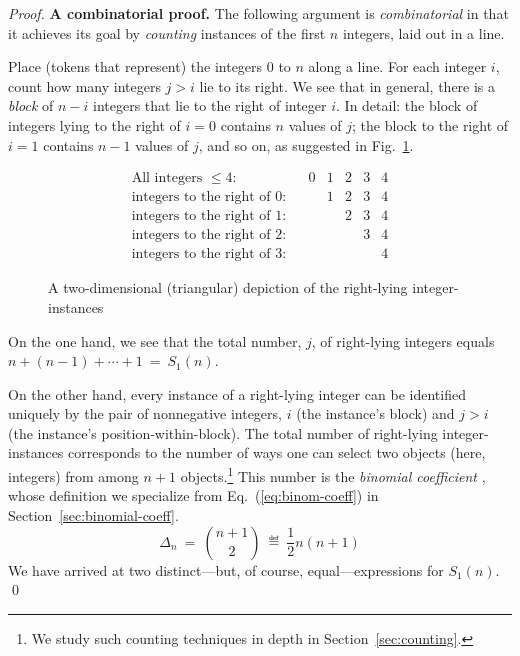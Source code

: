 \begin{proof}
{\bf A combinatorial proof.}
The following argument is {\it combinatorial} in that it achieves its goal by {\em counting} instances of the first $n$ integers, laid out in a line.

\smallskip

Place (tokens that represent) the integers $0$ to $n$ along a line.  For each integer $i$, count how many integers $j > i$ lie to its right.  We see that in general, there is a {\it block} of $n-i$ integers that lie to the right of integer $i$.  In detail: the block of integers lying to the right of $i=0$ contains $n$ values of $j$; the block to the right of $i=1$ contains $n-1$ values of $j$, and so on, as suggested in Fig.~\ref{fig:rightward-instances}.
\begin{figure}[htb]
\[
\begin{array}{lcccccc}
\mbox{All integers $\leq 4$:} &
 & 0 & 1 & 2 & 3 & 4 \\
\mbox{integers to the right of $0$:} &
 &   & 1 & 2 & 3 & 4 \\
\mbox{integers to the right of $1$:} &
 &   &   & 2 & 3 & 4 \\
\mbox{integers to the right of $2$:} &
 &   &   &   & 3 & 4 \\
\mbox{integers to the right of $3$:} &
 &   &   &   &   & 4
\end{array}
\]
\caption{A two-dimensional (triangular) depiction of the right-lying integer-instances}
\label{fig:rightward-instances}
\end{figure}

\smallskip

On the one hand, we see that the total number, $j$, of right-lying integers equals $n+(n-1)+ \cdots + 1 \ = \ S_1(n)$.

\smallskip

On the other hand, every instance of a right-lying integer can be identified uniquely by the pair of nonnegative integers, $i$ (the instance's block) and $j>i$ (the instance's position-within-block).
The total number of right-lying integer-instances corresponds to the number of ways one can select two objects (here, integers) from among $n+1$ objects.\footnote{We study such counting techniques in depth in Section~\ref{sec:counting}.}  This number is the {\it binomial coefficient }, whose definition we specialize from Eq.~(\ref{eq:binom-coeff}) in 
Section~\ref{sec:binomial-coeff}.
\[
\Delta_n  \ = \  {{n+1} \choose 2}  \  \eqdef  \  \frac{1}{2} n(n+1)
\]
We have arrived at two distinct---but, of course, equal---expressions for $S_1(n)$.  \qed
\end{proof}

